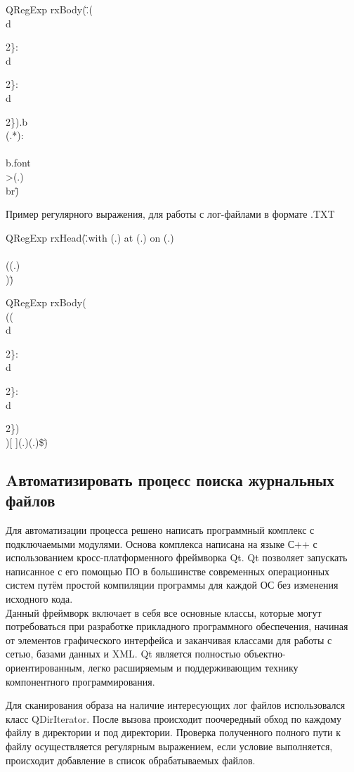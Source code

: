 QRegExp rxBody(\".\*(\\d{2\}:\\d\\{2\}:\\d\\{2\}).\*b\\\>(.*):\\\<\\\/b.\*font\\>(.\*)\\\<br\")


Пример регулярного выражения, для работы с лог-файлами в формате .TXT

QRegExp rxHead(\".\*with (.\*) at (.\*) on (.\*)\\\/ \\((.\*)\\)\")

QRegExp rxBody(\"\\((\\d\\{2\}:\\d\\{2\}:\\d\\{2\})\\)[ ]\*(.\*)\:(.\*)\$\")


\subsection{Aвтоматизировать процесс поиска журнальных файлов}

Для автоматизации процесса решено написать программный комплекс с подключаемыми модулями. Основа комплекса написана на языке С++ с использованием кросс-платформенного фреймворка Qt.
Qt позволяет запускать написанное с его помощью ПО в большинстве современных операционных систем путём простой компиляции программы для каждой ОС без изменения исходного кода.\\
Данный фреймворк включает в себя все основные классы, которые могут потребоваться при разработке прикладного программного обеспечения, начиная от элементов графического интерфейса и заканчивая классами для работы с сетью, базами данных и XML. Qt является полностью объектно-ориентированным, легко расширяемым и поддерживающим технику компонентного программирования.

Для сканирования образа на наличие интересующих лог файлов использовался класс QDirIterator. После вызова происходит поочередный обход по каждому файлу в директории и под директории. Проверка полученного полного пути к файлу осуществляется регулярным выражением, если условие выполняется, происходит добавление в список обрабатываемых файлов. 


}}}}}}
